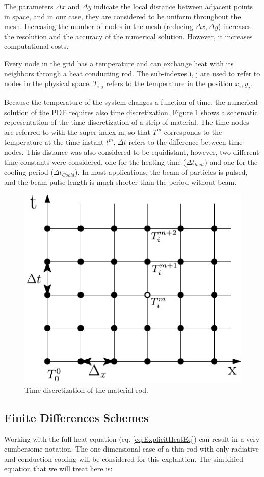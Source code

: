 The parameters $\Delta x$ and $\Delta y$ indicate the local distance between adjacent points in space, and in our case, they are considered to be uniform throughout the mesh. Increasing the number of nodes in the mesh (reducing $\Delta x , \Delta y$) increases the resolution and the accuracy of the numerical solution. However, it increases computational costs.

Every node in the grid has a temperature and can exchange heat with its neighbors through a heat conducting rod. The sub-indexes i, j are used to refer to nodes in the physical space.  $T_{i,j}$ refers to the temperature in the position $x_i , y_j$.

Because the temperature of the system changes a function of time, the numerical solution of the PDE requires also time discretization. Figure \ref{fig:TimeDiscret} shows a schematic representation of the time discretization of a strip of material. The time nodes are referred to with the super-index m, so that $T^{m}$ corresponds to the temperature at the time instant  $t^m$.  $\Delta t$ refers to the difference between time nodes. This distance was also considered to be equidistant, however, two different time constants were considered, one for the heating time ($\Delta {t}_{heat}$) and one for the cooling period ($\Delta t_{Coold}$). In most applications, the beam of particles is pulsed, and the beam pulse length is much shorter than the period without beam. 

\begin{figure}[h]
    \centering
    \includegraphics[width=0.4\columnwidth]{TimeDiscretization/TimeDiscret.pdf}
    \caption{Time discretization of the material rod.}
    \label{fig:TimeDiscret}
\end{figure}

\subsection{Finite Differences Schemes}
\label{sec:FD}

Working with the full heat equation (eq. \ref{eq:ExplicitHeatEq}) can result in a very cumbersome notation. The one-dimensional case of a thin rod with only radiative and conduction cooling will be considered for this explantion. The simplified equation that we will treat here is: 

